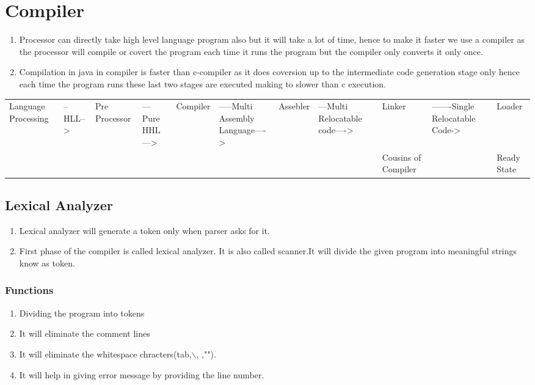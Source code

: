 \documentclass[11pt]{article}
\begin{document}
\section{Compiler}
\label{sec:org582118f}
\begin{enumerate}
\item Processor can directly take high level language program also but it will take a lot of time, hence to make it faster we use a compiler as the processor will compile or covert the program each time it runs the program but the compiler only converts it only once.
\item Compilation in java in compiler is faster than c-compiler as it does coversion up to the intermediate code generation stage only hence each time the program runs these last two stages are executed making to slower than c execution.
\end{enumerate}
\begin{center}
\begin{tabular}{lllllllllll}
\hline
Language Processing & --HLL--> & Pre Processor & ---Pure HHL---> & Compiler & -----Multi Assembly Language----> & Assebler & ---Multi Relocatable code----> & Linker & -------Single Relocatable Code-> & Loader\\[0pt]
 &  &  &  &  &  &  &  & Cousins of Compiler &  & Ready State\\[0pt]
\hline
\end{tabular}
\end{center}
\subsection{Lexical Analyzer}
\label{sec:org3a178ed}
\begin{enumerate}
\item Lexical analyzer will generate a token only when parser asks for it.
\item First phase of the compiler is called lexical analyzer. It is also called scanner.It will divide the given program into meaningful strings know as token.
\end{enumerate}
\subsubsection{Functions}
\label{sec:orgc68ab65}
\begin{enumerate}
\item Dividing the program into tokens
\item It will eliminate the comment lines
\item It will eliminate the whitespace chracters(tab,$\backslash$, ,"\n").
\item It will help in giving error message by providing the line number.
\end{enumerate}
\end{document}
